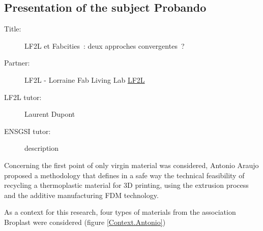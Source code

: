 \subsection{Presentation of the subject Probando}



\begin{description}
	\item[Title:] LF2L et Fabcities : deux approches convergentes ?  
	\item[Partner:] LF2L 	- Lorraine Fab Living Lab \href{http://www.lf2l.fr}{LF2L}			

	\item[LF2L tutor:] Laurent Dupont 
	\item[ENSGSI tutor:] description
\end{description}

Concerning the first point of only virgin material was considered, Antonio Araujo proposed a methodology that defines in a safe way the technical feasibility of recycling a thermoplastic material for 3D printing, using the extrusion process and the additive manufacturing FDM technology.

As a context for this research, four types of materials from the association Broplast were considered (figure \ref{Context.Antonio})




%	
%
%	
